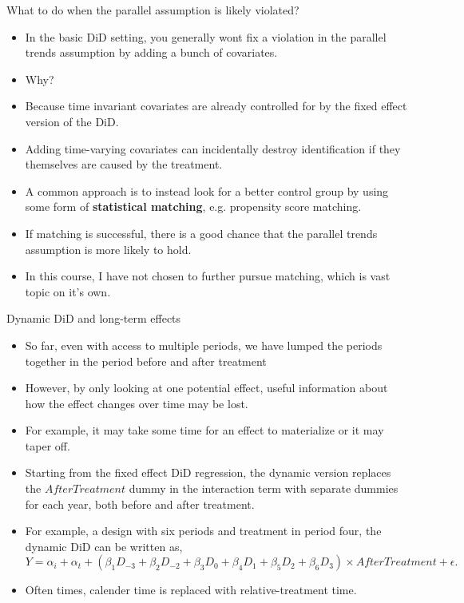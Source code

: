 \documentclass[notes,11pt, aspectratio=169]{beamer}
\begin{document}
\begin{frame}{What to do when the parallel assumption is likely violated?}
   \begin{itemize}
       \item In the basic DiD setting, you generally wont fix a violation in the parallel trends assumption by adding a bunch of covariates.
       \item Why?
       \item Because time invariant covariates are already controlled for by the fixed effect version of the DiD.
       \item Adding time-varying covariates can incidentally destroy identification if they themselves are caused by the treatment.
       \item A common approach is to instead look for a better control group by using some form of \textbf{statistical matching}, e.g. propensity score matching.
       \item If matching is successful, there is a good chance that the parallel trends assumption is more likely to hold.
       \item In this course, I have not chosen to further pursue matching, which is vast topic on it's own.
   \end{itemize}
\end{frame}

\begin{frame}{Dynamic DiD and long-term effects}
    \begin{itemize}
        \item So far, even with access to multiple periods, we have lumped the periods together in the period before and after treatment
        \item However, by only looking at one potential effect, useful information about how the effect changes over time may be lost.
        \item For example, it may take some time for an effect to materialize or it may taper off. 
        \item Starting from the fixed effect DiD regression, the dynamic version replaces the $AfterTreatment$ dummy in the interaction term with separate dummies for each year, both before and after treatment. 
        \item For example, a design with six periods and treatment in period four, the dynamic DiD can be written as,
        \begin{equation}
            Y = \alpha_i + \alpha_{t} + \left(\beta_{1}D_{-3}+\beta_{2} D_{-2} +\beta_{3} D_{0} + \beta_{4} D_{1}+ \beta_{5} D_{2} + \beta_{6} D_{3} \right) \times AfterTreatment + \epsilon.
        \end{equation}
        \item Often times, calender time is replaced with relative-treatment time.
    \end{itemize}
\end{frame}
\end{document}
